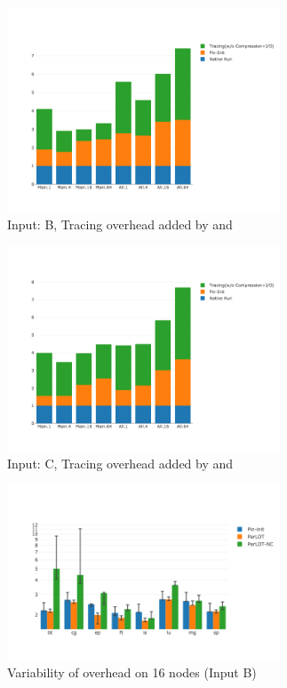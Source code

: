 \begin{figure}[t]
\centering
\includegraphics[width=3.2in]{figs.comet.newMed/comet_chartDet_B_woc_byTool_p3_5.png}
\caption{ Input: B, Tracing overhead added by \pininit and \parlotnc
}
\label{comet_chartDet_B_woc_byTool_p3_5}
\end{figure}

\begin{figure}[t]
\centering
\includegraphics[width=3.2in]{figs.comet.newMed/comet_chartDet_C_woc_byTool_p3_5.png}
\caption{ Input: C, Tracing overhead added by \pininit and \parlotnc}
\label{comet_chartDet_C_woc_byTool_p3_5}
\end{figure}




\begin{figure}[t]
\centering
\includegraphics[width=3.2in]{figs.comet.newMed/comet_BX2_Main_16_B_p3_5.png}
\caption{ Variability of \parlotm overhead on 16 nodes (Input B)
}
\label{comet_BX2_Main_16_B_p3_5}
\end{figure}




